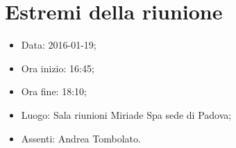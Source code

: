 \documentclass[../template.tex]{subfiles}
\begin{document}
\section{Estremi della riunione}
	\begin{itemize}
		\item Data: 2016-01-19;
		\item Ora inizio: 16:45;
		\item Ora fine: 18:10;
		\item Luogo: Sala riunioni Miriade Spa sede di Padova;
		\item Assenti: Andrea Tombolato.
	\end{itemize}
\end{document}
